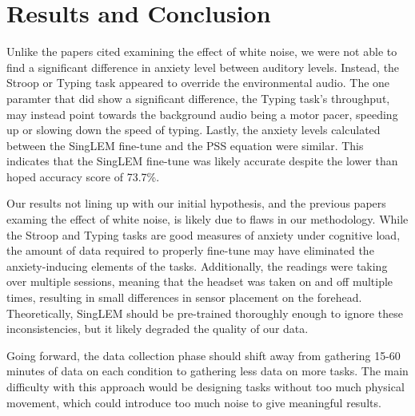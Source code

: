 \documentclass[journal]{IEEEtran}
\begin{document}
\section{Results and Conclusion}
Unlike the papers cited examining the effect of white noise, we were not able to find a significant difference in anxiety level between auditory levels. Instead, the Stroop or Typing task appeared to override the environmental audio. The one paramter that did show a significant difference, the Typing task's throughput, may instead point towards the background audio being a motor pacer, speeding up or slowing down the speed of typing. Lastly, the anxiety levels calculated between the SingLEM fine-tune and the PSS equation were similar. This indicates that the SingLEM fine-tune was likely accurate despite the lower than hoped accuracy score of 73.7\%.

Our results not lining up with our initial hypothesis, and the previous papers examing the effect of white noise, is likely due to flaws in our methodology. While the Stroop and Typing tasks are good measures of anxiety under cognitive load, the amount of data required to properly fine-tune may have eliminated the anxiety-inducing elements of the tasks. Additionally, the readings were taking over multiple sessions, meaning that the headset was taken on and off multiple times, resulting in small differences in sensor placement on the forehead. Theoretically, SingLEM should be pre-trained thoroughly enough to ignore these inconsistencies, but it likely degraded the quality of our data.

Going forward, the data collection phase should shift away from gathering 15-60 minutes of data on each condition to gathering less data on more tasks. The main difficulty with this approach would be designing tasks without too much physical movement, which could introduce too much noise to give meaningful results.



\end{document}

